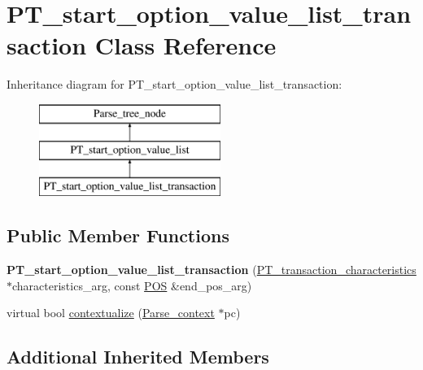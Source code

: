 \hypertarget{classPT__start__option__value__list__transaction}{}\section{P\+T\+\_\+start\+\_\+option\+\_\+value\+\_\+list\+\_\+transaction Class Reference}
\label{classPT__start__option__value__list__transaction}
Inheritance diagram for P\+T\+\_\+start\+\_\+option\+\_\+value\+\_\+list\+\_\+transaction\+:\begin{figure}[H]
\begin{center}
\leavevmode
\includegraphics[height=3.000000cm]{classPT__start__option__value__list__transaction}
\end{center}
\end{figure}
\subsection*{Public Member Functions}
\begin{DoxyCompactItemize}
\item 
\mbox{\label{classPT__start__option__value__list__transaction_af6173251b13172e1ed5abc261d991513}} 
{\bfseries P\+T\+\_\+start\+\_\+option\+\_\+value\+\_\+list\+\_\+transaction} (\mbox{\hyperlink{classPT__transaction__characteristics}{P\+T\+\_\+transaction\+\_\+characteristics}} $\ast$characteristics\+\_\+arg, const \mbox{\hyperlink{structYYLTYPE}{P\+OS}} \&end\+\_\+pos\+\_\+arg)
\item 
virtual bool \mbox{\hyperlink{classPT__start__option__value__list__transaction_aec9fbcabdc159f19244db60e3ca5d59e}{contextualize}} (\mbox{\hyperlink{structParse__context}{Parse\+\_\+context}} $\ast$pc)
\end{DoxyCompactItemize}
\subsection*{Additional Inherited Members}


